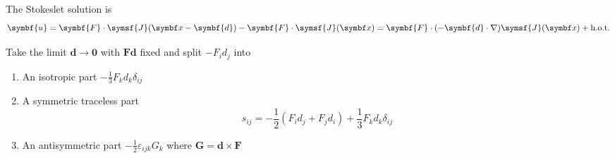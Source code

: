\documentclass{jknotes}
\begin{document}
\begin{center}
\end{center}

The Stokeslet solution is
\begin{equation}
	\symbf{u} = \symbf{F}\cdot\symsf{J} (\x-\symbf{d}) - \symbf{F} \cdot \symsf{J}(\x) =
	\symbf{F} \cdot (-\symbf{d}\cdot\nabla)\symsf{J}(\x) + \text{h.o.t.}
\end{equation}

Take the limit $\symbf{d} \to \symbf{0}$ with $\symbf{F}\symbf{d}$ fixed and split $-F_i
d_j$ into
\begin{enumerate}
	\item An isotropic part $-\frac{1}{3} F_k d_k \delta_{ij}$
	\item A symmetric traceless part
		\begin{equation}
			s_{ij} = -\frac{1}{2} (F_i d_j + F_j d_i) + \frac{1}{3} F_k d_k
			\delta_{ij}
		\end{equation}
	\item An antisymmetric part $-\frac{1}{2}\varepsilon_{ijk} G_k$ where
		$\symbf{G} = \symbf{d} \times \symbf{F}$
\end{enumerate}
\end{document}
